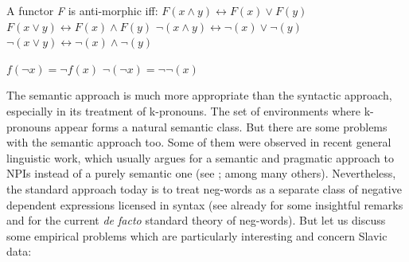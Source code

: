 \documentclass[output=paper,colorlinks,citecolor=brown]{langscibook}
\begin{document}
\ea\label{ex:31}A functor \textit{F} is anti-morphic iff:
\ea $F(x \wedge y) \leftrightarrow F(x) \vee F(y)$
\ex $F(x \vee y) \leftrightarrow F(x) \wedge F(y)$
\ex $\neg(x \wedge y) \leftrightarrow \neg(x) \vee \neg(y)$
\ex $\neg(x \vee y) \leftrightarrow \neg(x) \wedge \neg(y)$
\z
\z

\ea\label{ex:32}\ea \label{ex:32-a}$f(\neg x) = \neg f(x)$
\ex \label{ex:32-b}$\neg (\neg x) = \neg \neg (x)$
\z
\z

\noindent The semantic approach is much more appropriate than the syntactic approach, especially in its treatment of k-pronouns. The set of environments where k-pronouns appear forms a natural semantic class. But there are some problems with the semantic approach too. Some of them were observed in recent general linguistic work, which usually argues for a semantic and pragmatic approach to NPIs instead of a purely semantic one (see \citealt{krifka1995semantics, gajewski2011licensing, Chierchia2013}; among many others). Nevertheless, the standard approach today is to treat neg-words as a separate class of negative dependent expressions licensed in syntax (see already \citealt{krifka1995semantics} for some insightful remarks and \citealt{zeijlstra2004sentential} for the current \textit{de facto} standard theory of neg-words). But let us discuss some empirical problems which are particularly interesting and concern Slavic data:
\end{document}
